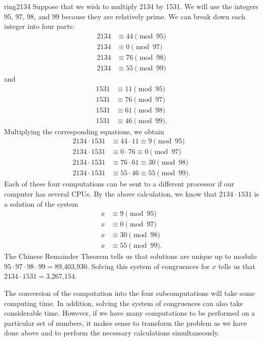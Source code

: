  
\begin{example}{ring2134}
Suppose that we wish to multiply 2134 by 1531. We will use the integers
95, 97, 98, and 99 because they are relatively prime. We can break down
each integer into four parts:
\begin{align*}
2134 & \equiv  44 \pmod{95} \\
2134 & \equiv  0 \pmod{97} \\
2134 & \equiv  76 \pmod{98} \\
2134 & \equiv  55 \pmod{99} 
\end{align*}
and
\begin{align*}
1531 & \equiv  11 \pmod{95} \\
1531 & \equiv  76 \pmod{97} \\
1531 & \equiv  61 \pmod{98} \\
1531 & \equiv  46 \pmod{99}. 
\end{align*}
Multiplying the corresponding equations, we obtain
\begin{align*}
2134 \cdot 1531 & \equiv  44 \cdot 11  \equiv  9 \pmod{95} \\
2134 \cdot 1531 & \equiv  0  \cdot 76  \equiv  0 \pmod{97} \\
2134 \cdot 1531 & \equiv  76 \cdot 61  \equiv  30 \pmod{98} \\
2134 \cdot 1531 & \equiv  55 \cdot 46  \equiv 55 \pmod{99}. 
\end{align*}
Each of these four computations can be sent to a different processor
if our computer has several CPUs. By the above calculation, we know
that \mbox{$2134 \cdot 1531$} is a solution of the system
\begin{align*}
x & \equiv  9 \pmod{95} \\
x & \equiv  0 \pmod{97} \\
x & \equiv  30 \pmod{98} \\
x & \equiv  55 \pmod{99}. 
\end{align*}
The Chinese Remainder Theorem tells us that solutions are unique up to
modulo $95 \cdot 97 \cdot 98 \cdot 99 = \mbox{89,403,930}$. Solving
this system of congruences for $x$ tells us that $2134 \cdot 1531 =
\mbox{3,267,154}$.  
 
 
The conversion of the computation into the four subcomputations will
take some computing time.  In addition, solving the system of
congruences can also take considerable time.  However, if we have
many computations to be performed on a particular set of numbers, it
makes sense to transform the problem as we have done above and to perform
the necessary calculations simultaneously.
\end{example}
 

